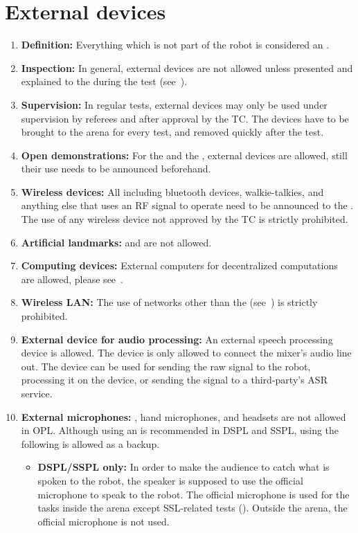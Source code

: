 \section{External devices}\label{rule:roobt_external_devices}
\begin{enumerate}
	\item \textbf{Definition:} Everything which is not part of the robot is considered an .
	\item \textbf{Inspection:} In general, external devices are not allowed unless presented and explained to the  during the  test (see~).
	\item \textbf{Supervision:} In regular tests, external devices may only be used under supervision by referees and after approval by the TC. The devices have to be brought to the arena for every test, and removed quickly after the test.
	\item \textbf{Open demonstrations:} For the  and the , external devices are allowed, still their use needs to be announced beforehand.
	\item \textbf{Wireless devices:} All  including bluetooth devices, walkie-talkies, and anything else that uses an RF signal to operate need to be announced to the . The use of any wireless device not approved by the TC is strictly prohibited.
	\item \textbf{Artificial landmarks:}  and  are not allowed.
	\item \textbf{Computing devices:} External computers for decentralized computations are allowed, please see~.
	\item \textbf{Wireless LAN:} The use of networks other than the  (see~) is strictly prohibited.
	\item \textbf{External device for audio processing: }An external speech processing device is allowed. The device is only allowed to connect the mixer's audio line out. The device can be used for sending the raw signal to the robot, processing it on the device, or sending the signal to a third-party's ASR service.
	\item \textbf{External microphones: }, hand microphones, and headsets are not allowed in OPL. Although using an  is recommended in DSPL and SSPL, using the following  is allowed as a backup.
	\begin{itemize}
	\item \textbf{DSPL/SSPL only: }In order to make the audience to catch what is spoken to the robot, the speaker is supposed to use the official microphone to speak to the robot. The official microphone is used for the tasks inside the arena except SSL-related tests (). Outside the arena, the official microphone is not used.
	\end{itemize}
\end{enumerate}


